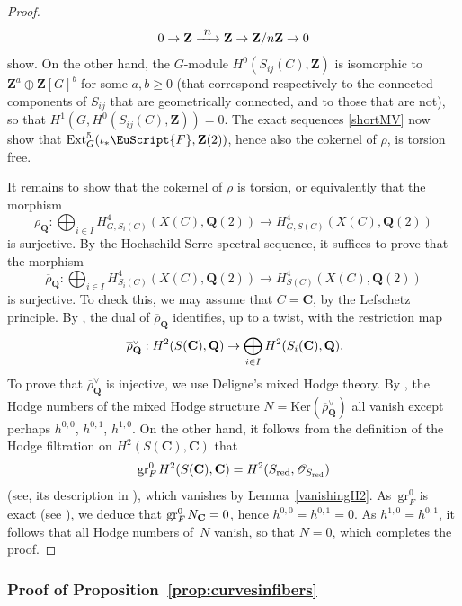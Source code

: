 \documentclass[JEP,XML,SOM,Unicode]{cedram}
\let\mathcal\EuScript
\newcommand{\To}[1]{\mathchoice{\xrightarrow{\textstyle\kern4pt#1\kern3pt}}{\stackrel{#1}{\longrightarrow}}{}{}}
\let\oldvee\vee
\renewcommand{\vee}{{\scriptscriptstyle\oldvee}}
\theoremstyle{plain}
\theoremstyle{definition}
\numberwithin{equation}{section}
\newcommand{\gr}{{\mathrm{gr}}}
\newcommand{\sO}{{\mathscr O}}
\renewcommand{\C}{{\mathbf C}}
\newcommand{\Q}{{\mathbf Q}}
\newcommand{\Z}{{\mathbf Z}}
\newcommand{\red}{{\mathrm{red}}}
\newcommand{\Ker}{{\mathrm{Ker}}}
\newcommand{\Ext}{{\mathrm{Ext}}}
\begin{document}
\begin{proof}
\[
0\to\Z\To{n}\Z\to\Z/n\Z\to 0
\]
show.
On the other hand, the $G$\nobreakdash-module $H^0(S_{ij}(C),\Z)$ is isomorphic to $\Z^a \oplus \Z[G]^b$ for some $a,b\geq 0$ (that correspond respectively to the connected components of $S_{ij}$ that are geometrically connected, and to those that are not),
so that $H^1(G, H^0(S_{ij}(C),\Z))=0$. The exact sequences \eqref{shortMV} now show that $\Ext^5_G(\iota_*\mathcal{F},\Z(2))$, hence also the cokernel of $\rho$, is torsion free.

It remains to show that the cokernel of $\rho$ is torsion, or equivalently that the morphism
\[
\rho_{\Q}:\bigoplus_{i\in I} H^4_{G,S_i(C)}(X(C),\Q(2))\to H^4_{G,S(C)}(X(C),\Q(2))
\]
is surjective.
By the Hochschild-Serre spectral sequence, it suffices to prove that the morphism
\[
\overline{\rho}_{\Q}:\bigoplus_{i\in I} H^4_{S_i(C)}(X(C),\Q(2))\to H^4_{S(C)}(X(C),\Q(2))
\]
is surjective.
To check this, we may assume that $C=\C$, by the Lefschetz principle.
By \cite[Cor.\,6.28]{peterssteenbrinkbook},
the dual of $\overline{\rho}_{\Q}$ identifies, up to a twist, with the restriction map
\[
\overline{\rho}_{\Q}^{\vee}: H^{2}(S(\C),\Q)\to \bigoplus_{i\in I} H^{2}(S_i(\C),\Q)\rlap{.}
\]
To prove that $\overline{\rho}_{\Q}^{\vee}$ is injective, we use Deligne's mixed Hodge theory.
By \cite[Prop.\,8.2.5 and Théorème~8.2.4]{HodgeIII},
the Hodge numbers of the mixed Hodge structure
$N=\Ker(\overline{\rho}_{\Q}^{\vee})$
all vanish except perhaps $h^{0,0}$, $h^{0,1}$, $h^{1,0}$.
On the other hand, it follows from the definition of the Hodge filtration on $H^2(S(\C),\C)$
that
\[
\gr^0_F\mkern2muH^2(S(\C),\C)=H^2(S_\red,\sO_{S_\red})
\]
(see, \eg its description in \cite[Ch.\,4, ]{AGIII}),
which vanishes by Lemma~\ref{vanishingH2}.
As~$\gr^0_F$ is exact (see \cite[Th.\,2.3.5]{HodgeII}), we deduce that $\gr^0_F\mkern2muN_\C=0$,
hence $h^{0,0}=h^{0,1}=0$. As $h^{1,0}=h^{0,1}$, it follows that all Hodge numbers of~$N$ vanish, so that
$N=0$, which completes the proof.
\end{proof}

\subsubsection{Proof of Proposition~\ref{prop:curvesinfibers}}
\label{subsubsec:proofofcurvesinfibers}
\end{document}
